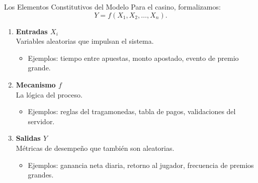 \documentclass[aspectratio=1610, 9pt]{beamer}
\begin{document}
\begin{frame}{Los Elementos Constitutivos del Modelo}
    Para el casino, formalizamos:
    \[
    Y=f(X_1,X_2,\dots,X_n).
    \]

    \vspace{0.2cm}
    \begin{enumerate}
        \item \textbf{Entradas $X_i$}\\
        Variables aleatorias que impulsan el sistema.
        \begin{itemize}
            \item Ejemplos: tiempo entre apuestas, monto apostado, evento de premio grande.
        \end{itemize}

        \item \textbf{Mecanismo $f$}\\
        La lógica del proceso.
        \begin{itemize}
            \item Ejemplos: reglas del tragamonedas, tabla de pagos, validaciones del servidor.
        \end{itemize}

        \item \textbf{Salidas $Y$}\\
        Métricas de desempeño que también son aleatorias.
        \begin{itemize}
            \item Ejemplos: ganancia neta diaria, retorno al jugador, frecuencia de premios grandes.
        \end{itemize}
    \end{enumerate}
\end{frame}
\end{document}
